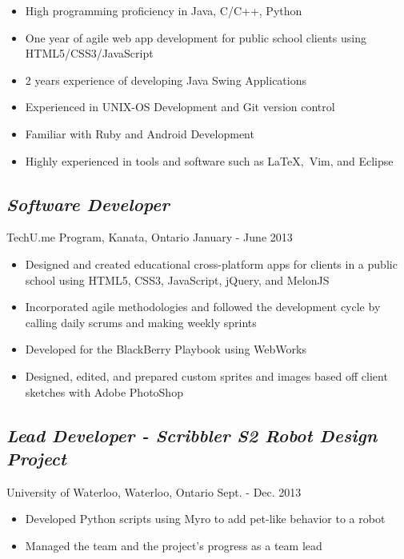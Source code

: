 \documentclass[10pt]{article}
\begin{document}
\begin{minipage}[t]{0.84\linewidth} 
	\begin{itemize}
		\item High programming proficiency in Java, C/C++, Python
		\item One year of agile web app development for public school clients using HTML5/CSS3/JavaScript
		\item 2 years experience of developing Java Swing Applications
		\item Experienced in UNIX-OS Development and Git version control
		\item Familiar with Ruby and Android Development
		\item Highly experienced in tools and software such as \LaTeX,\ Vim, and Eclipse
	\end{itemize}

	\subsection*{\textit{Software Developer}} \vspace{-6pt} 
		TechU.me Program, Kanata, Ontario \hspace{140pt} January - June 2013
		\begin{itemize}
			\item Designed and created educational cross-platform apps for clients in a public school using HTML5, CSS3, JavaScript, jQuery, and MelonJS
			\item Incorporated agile methodologies and followed the development cycle by calling daily scrums and 						making weekly sprints
			\item Developed for the BlackBerry Playbook using WebWorks
			\item Designed, edited, and prepared custom sprites and images based off client sketches with Adobe 							PhotoShop
		\end{itemize}
		
	\subsection*{\textit{Lead Developer - Scribbler S2 Robot Design Project}} \vspace{-6pt} 
		University of Waterloo, Waterloo, Ontario \hspace{125pt} Sept. - Dec. 2013
		\begin{itemize}
			\item Developed Python scripts using Myro to add pet-like behavior to a robot 
			\item Managed the team and the project's progress as a team lead			
		\end{itemize}
		

\end{minipage}
\end{document}
